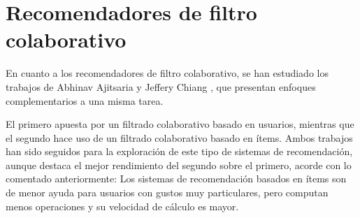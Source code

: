 
\section{Recomendadores de filtro colaborativo}

En cuanto a los recomendadores de filtro colaborativo, se han estudiado los trabajos de Abhinav Ajitsaria \cite{filtro_colaborativo_1} y Jeffery Chiang \cite{filtro_colaborativo_2}, que presentan enfoques complementarios a una misma tarea.

El primero apuesta por un filtrado colaborativo basado en usuarios, mientras que el segundo hace uso de un filtrado colaborativo basado en ítems. Ambos trabajos han sido seguidos para la exploración de este tipo de sistemas de recomendación, aunque destaca el mejor rendimiento del segundo sobre el primero, acorde con lo comentado anteriormente: Los sistemas de recomendación basados en ítems son de menor ayuda para usuarios con gustos muy particulares, pero computan menos operaciones y su velocidad de cálculo es mayor.